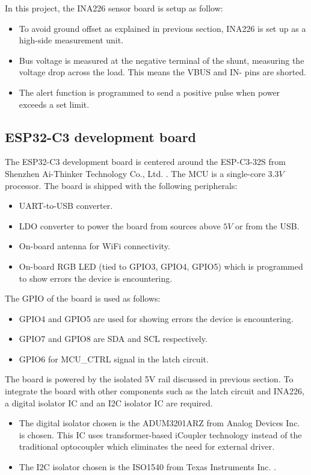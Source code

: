 \documentclass[../main.tex]{subfiles}
\begin{document}
    \justify
    In this project, the INA226 sensor board is setup as follow:
    \begin{itemize}
        \item To avoid ground offset as explained in previous section, INA226 is set up as a high-side measurement unit.
        \item Bus voltage is measured at the negative terminal of the shunt, measuring the voltage drop across the load. This means the VBUS and IN- pins are shorted.
        \item The alert function is programmed to send a positive pulse when power exceeds a set limit.
    \end{itemize} 

    \pagebreak
    \subsection{ESP32-C3 development board}

    \justify
    The ESP32-C3 development board is centered around the ESP-C3-32S from Shenzhen Ai-Thinker Technology Co., Ltd. \cite{ESP32}. The MCU is a single-core $3.3V$ processor. The board is shipped with the following peripherals:
    \begin{itemize}
        \item UART-to-USB converter.
        \item LDO converter to power the board from sources above $5V$ or from the USB.
        \item On-board antenna for WiFi connectivity.
        \item On-board RGB LED (tied to GPIO3, GPIO4, GPIO5) which is programmed to show errors the device is encountering.
    \end{itemize}

    \justify
    The GPIO of the board is used as follows:
    \begin{itemize}
        \item GPIO4 and GPIO5 are used for showing errors the device is encountering.
        \item GPIO7 and GPIO8 are SDA and SCL respectively.
        \item GPIO6 for MCU\_CTRL signal in the latch circuit.
    \end{itemize}

    \justify
    The board is powered by the isolated 5V rail discussed in previous section. To integrate the board with other components such as the latch circuit and INA226, a digital isolator IC and an I2C isolator IC are required. 
    \begin{itemize}
        \item The digital isolator chosen is the ADUM3201ARZ from Analog Devices Inc. \cite{ADUM3201} is chosen. This IC uses transformer-based iCoupler technology instead of the traditional optocoupler which eliminates the need for external driver.
        \item The I2C isolator chosen is the ISO1540 from Texas Instruments Inc. \cite{ISO1540}.
    \end{itemize}
    
\end{document}
